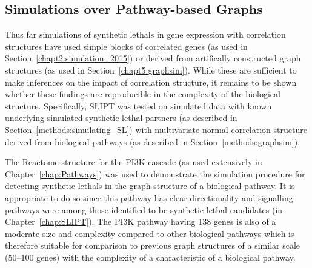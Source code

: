 

\subsection{Simulations over Pathway-based Graphs}

\FloatBarrier

Thus far simulations of \glspl{synthetic lethal} in \gls{gene expression} with correlation structures have used simple blocks of correlated genes (as used in Section~\ref{chapt2:simulation_2015}) or derived from artifically constructed \gls{graph} structures (as used in Section~\ref{chapt5:graphsim}). While these are sufficient to make inferences on the impact of correlation structure, it remains to be shown whether these findings are reproducible in the complexity of the biological  structure. Specifically, \gls{SLIPT} was tested on simulated data with known underlying simulated \gls{synthetic lethal} partners (as described in Section~\ref{methods:simulating_SL}) with multivariate normal correlation structure derived from biological pathways (as described in Section~\ref{methods:graphsim}).

The Reactome  structure for the \gls{PI3K} cascade (as used extensively in Chapter~\ref{chap:Pathways}) was used to demonstrate the simulation procedure for detecting \glspl{synthetic lethal} in the \gls{graph} structure of a biological pathway. It is appropriate to do so since this pathway has clear directionality and signalling pathways were among those identified to be \gls{synthetic lethal} candidates (in Chapter~\ref{chap:SLIPT}). The \gls{PI3K} pathway having 138 genes is also of a moderate size and complexity compared to other biological pathways which is therefore suitable for comparison to previous \gls{graph} structures of a similar scale (50--100 genes) with the complexity of a characteristic of a biological pathway.

